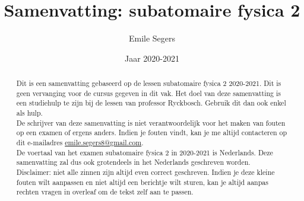 \documentclass{article}
\title{Samenvatting: subatomaire fysica 2}
\author{Emile Segers}
\date{Jaar 2020-2021}
\begin{document}
\maketitle

\begin{abstract}
    Dit is een samenvatting gebaseerd op de lessen subatomaire fysica 2 2020-2021. Dit is geen vervanging voor de cursus gegeven in dit vak. Het doel van deze samenvatting is een studiehulp te zijn bij de lessen van professor Ryckbosch. Gebruik dit dan ook enkel als hulp.\\
    De schrijver van deze samenvatting is niet verantwoordelijk voor het maken van fouten op een examen of ergens anders. Indien je fouten vindt, kan je me altijd contacteren op dit e-mailadres \href{mailto:emile.segers8@gmail.com}{emile.segers8@gmail.com}.\\
    De voertaal van het examen subatomaire fysica 2 in 2020-2021 is Nederlands. Deze samenvatting zal dus ook grotendeels in het Nederlands geschreven worden.\\
    {\color{red} Disclaimer:} niet alle zinnen zijn altijd even correct geschreven. Indien je deze kleine fouten wilt aanpassen en niet altijd een berichtje wilt sturen, kan je altijd aanpas rechten vragen in overleaf om de tekst zelf aan te passen.

\end{abstract}

\tableofcontents
























\end{document}

